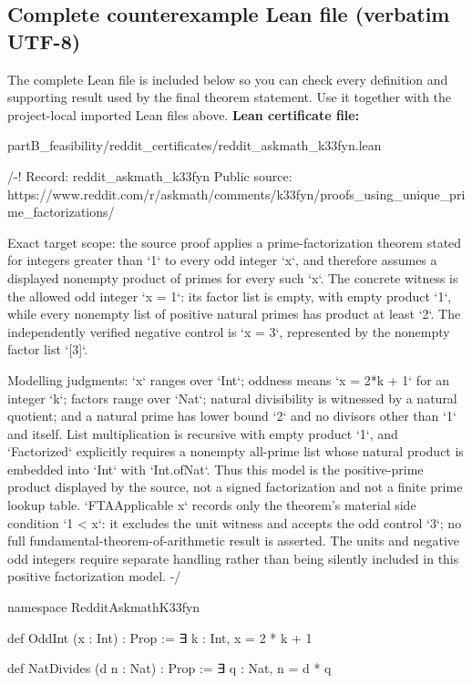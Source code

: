 \documentclass[11pt]{article}
\begin{document}
\subsection*{Complete counterexample Lean file (verbatim UTF-8)}
The complete Lean file is included below so you can check every definition and supporting result used by the final theorem statement. Use it together with the project-local imported Lean files above.
\textbf{Lean certificate file:}
\begin{Vsrc}
partB_feasibility/reddit_certificates/reddit_askmath_k33fyn.lean
\end{Vsrc}
\begin{Vlean}
/-!
Record: reddit_askmath_k33fyn
Public source: https://www.reddit.com/r/askmath/comments/k33fyn/proofs_using_unique_prime_factorizations/

Exact target scope: the source proof applies a prime-factorization theorem stated
for integers greater than `1` to every odd integer `x`, and therefore assumes a
displayed nonempty product of primes for every such `x`.  The concrete witness
is the allowed odd integer `x = 1`: its factor list is empty, with empty product
`1`, while every nonempty list of positive natural primes has product at least
`2`.  The independently verified negative control is `x = 3`, represented by
the nonempty factor list `[3]`.

Modelling judgments: `x` ranges over `Int`; oddness means `x = 2*k + 1` for an
integer `k`; factors range over `Nat`; natural divisibility is witnessed by a
natural quotient; and a natural prime has lower bound `2` and no divisors other
than `1` and itself.  List multiplication is recursive with empty product `1`,
and `Factorized` explicitly requires a nonempty all-prime list whose natural
product is embedded into `Int` with `Int.ofNat`.  Thus this model is the
positive-prime product displayed by the source, not a signed factorization and
not a finite prime lookup table.  `FTAApplicable x` records only the theorem's
material side condition `1 < x`: it excludes the unit witness and accepts the
odd control `3`; no full fundamental-theorem-of-arithmetic result is asserted.
The units and negative odd integers require separate handling rather than being
silently included in this positive factorization model.
-/

namespace RedditAskmathK33fyn

def OddInt (x : Int) : Prop :=
  ∃ k : Int, x = 2 * k + 1

def NatDivides (d n : Nat) : Prop :=
  ∃ q : Nat, n = d * q


\end{Vlean}
\end{document}
